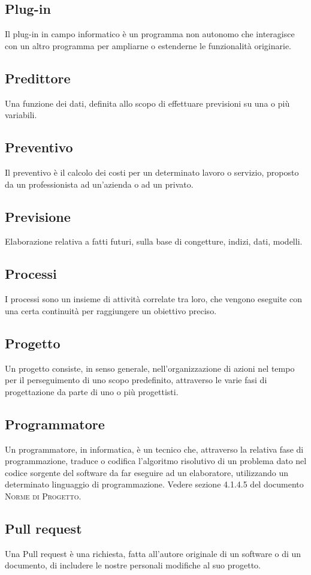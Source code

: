 
\subsection*{Plug-in}
Il plug-in in campo informatico è un programma non autonomo che interagisce con un altro programma per ampliarne o estenderne le funzionalità originarie.

\subsection*{Predittore}
Una funzione dei dati, definita allo scopo di effettuare previsioni su una o più variabili.

\subsection*{Preventivo}
Il preventivo è il calcolo dei costi per un determinato lavoro o servizio, proposto da un professionista ad un'azienda o ad un privato.

\subsection*{Previsione}
Elaborazione relativa a fatti futuri, sulla base di congetture, indizi, dati, modelli.

\subsection*{Processi}
I processi sono un insieme di attività correlate tra loro, che vengono eseguite con una certa continuità per raggiungere un obiettivo preciso.

\subsection*{Progetto}
Un progetto consiste, in senso generale, nell'organizzazione di azioni nel tempo per il perseguimento di uno scopo predefinito, attraverso le varie fasi di progettazione da parte di uno o più progettisti.

\subsection*{Programmatore}
Un programmatore, in informatica, è un tecnico che, attraverso la relativa fase di programmazione, traduce o codifica l'algoritmo risolutivo di un problema dato nel codice sorgente del software da far eseguire ad un elaboratore, utilizzando un determinato linguaggio di programmazione. Vedere sezione 4.1.4.5 del documento \textsc{Norme di Progetto}.

\subsection*{Pull request}
Una Pull request è una richiesta, fatta all’autore originale di un software o di un documento, di includere le nostre personali modifiche al suo progetto.


